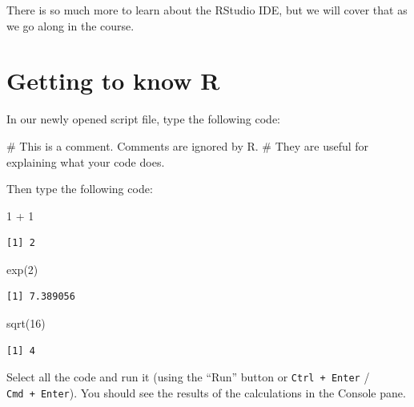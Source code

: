 \documentclass[
  letterpaper,
  8pt,
  a4paper]{book}
\newenvironment{Shaded}{\begin{snugshade}}{\end{snugshade}}
\newcommand{\CommentTok}[1]{\textcolor[rgb]{0.37,0.37,0.37}{#1}}
\newcommand{\DecValTok}[1]{\textcolor[rgb]{0.68,0.00,0.00}{#1}}
\newcommand{\FunctionTok}[1]{\textcolor[rgb]{0.28,0.35,0.67}{#1}}
\newcommand{\NormalTok}[1]{\textcolor[rgb]{0.00,0.23,0.31}{#1}}
\newcommand{\SpecialCharTok}[1]{\textcolor[rgb]{0.37,0.37,0.37}{#1}}
\begin{document}
There is so much more to learn about the RStudio IDE, but we will cover
that as we go along in the course.

\section*{Getting to know R}\label{getting-to-know-r}


In our newly opened script file, type the following code:

\begin{Shaded}
\begin{Highlighting}[]
\CommentTok{\# This is a comment. Comments are ignored by R.}
\CommentTok{\# They are useful for explaining what your code does.}
\end{Highlighting}
\end{Shaded}

Then type the following code:

\begin{Shaded}
\begin{Highlighting}[]
\DecValTok{1} \SpecialCharTok{+} \DecValTok{1}
\end{Highlighting}
\end{Shaded}

\begin{verbatim}
[1] 2
\end{verbatim}

\begin{Shaded}
\begin{Highlighting}[]
\FunctionTok{exp}\NormalTok{(}\DecValTok{2}\NormalTok{)}
\end{Highlighting}
\end{Shaded}

\begin{verbatim}
[1] 7.389056
\end{verbatim}

\begin{Shaded}
\begin{Highlighting}[]
\FunctionTok{sqrt}\NormalTok{(}\DecValTok{16}\NormalTok{)}
\end{Highlighting}
\end{Shaded}

\begin{verbatim}
[1] 4
\end{verbatim}

Select all the code and run it (using the ``Run'' button or
\texttt{Ctrl\ +\ Enter} / \texttt{Cmd\ +\ Enter}). You should see the
results of the calculations in the Console pane.
\end{document}
